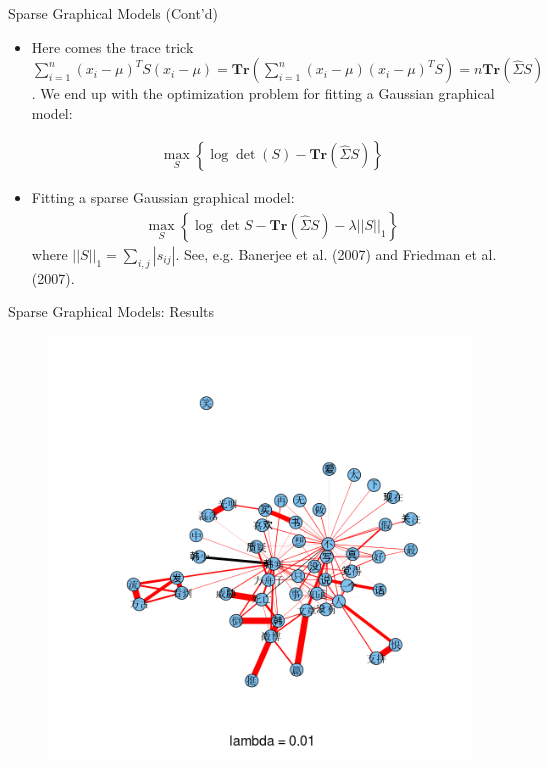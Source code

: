 \documentclass[12pt]{beamer}
\newcommand{\1}[1]{{\mathbf 1}\left\{#1\right\}}        %
\def\lp{\left(}
\def\rp{\right)}
\begin{document}
\begin{frame}[fragile]{Sparse Graphical Models (Cont'd)}

\begin{itemize}[<+->]
\item  Here comes the trace trick $\sum_{i=1}^n(x_i-\mu)^T S (x_i-\mu) = \textbf{Tr} (\sum_{i=1}^n (x_i-\mu)(x_i-\mu)^TS) = n\textbf{Tr}(\hat{\Sigma}S)$. We end up with the optimization problem for fitting a Gaussian graphical model:

\begin{align*}
\max_S \left\{  \log \det \lp S\rp - \textbf{Tr}\lp \hat{\Sigma}S \rp  \right\}
\end{align*}

\item  Fitting a sparse Gaussian graphical model:
\begin{align*}
\max_S \left\{ \log \det S - \textbf{Tr} \lp \hat{\Sigma}S \rp - \lambda ||S||_1 \right\}
\end{align*}
where $||S||_1 = \sum_{i,j}|s_{ij}|$. See, e.g. Banerjee et al. (2007) and Friedman et al. (2007). 

\end{itemize}

\end{frame}

\begin{frame}{Sparse Graphical Models: Results}

\begin{figure}
  \centering
  \includegraphics[height=0.9\textheight]{./../../gLassoResults/glasso1.png} 
\end{figure}

\end{frame}
\end{document}
